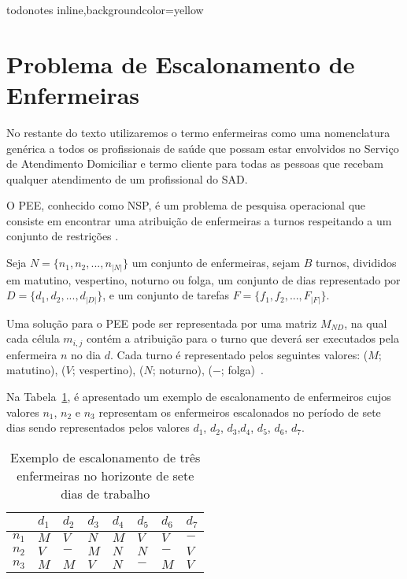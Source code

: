 { }

\presetkeys%
    {todonotes}%
    {inline,backgroundcolor=yellow}{}


\section{Problema de Escalonamento de Enfermeiras}

No restante do texto utilizaremos o termo enfermeiras como uma nomenclatura genérica a todos os profissionais de saúde que possam estar envolvidos no Serviço de Atendimento Domiciliar e termo cliente para todas as pessoas que recebam qualquer atendimento de um profissional do \ac{SAD}.

O \ac{PEE}, conhecido como \ac{NSP}, é um problema de pesquisa operacional que consiste em encontrar uma atribuição de enfermeiras a turnos respeitando a um conjunto de restrições \cite{ioanis:2015}.

Seja $N = \{n_1, n_2, ..., n_{|N|}\}$ um conjunto de enfermeiras, sejam $B$ turnos, divididos em matutino, vespertino, noturno ou folga, um conjunto de dias representado por $D = \{d_1, d_2, ..., d_{|D|}\}$, e um conjunto de tarefas $F = \{ f_1, f_2, ..., F_{|F|} \}$. 

Uma solução para o \ac{PEE} pode ser representada por uma matriz $M_{ND}$, na qual cada célula $m_{i,j}$ contém a atribuição para o turno que deverá ser executados pela enfermeira $n$ no dia $d$.
Cada turno é representado pelos seguintes valores: ($M$; matutino), ($V$; vespertino), ($N$; noturno), ($-$; folga)~\cite{gambini:2012}. 

Na Tabela~\ref{enfermeira_dia}, é apresentado um exemplo de escalonamento de enfermeiros cujos valores $n_1$, $n_2$ e $n_3$ representam os enfermeiros escalonados no período de sete dias sendo representados pelos valores $d_1$, $d_2$, $d_3$,$d_4$, $d_5$, $d_6$, $d_7$.

\begin{table}[ht]
 \centering
\caption{Exemplo de escalonamento de três enfermeiras no horizonte de sete dias de trabalho \label{enfermeira_dia}}
\begin{tabular}{r|l|l|l|l|l|l|l}
  	   & $d_1$ & $d_2$ & $d_3$ & $d_4$ & $d_5$ & $d_6$ & $d_7$ \\ \hline
 $n_1$ & $M$  & $V$  & $N$  & $M$  & $V$  & $V$  & $-$ \\ \hline
 $n_2$ & $V$  & $-$  & $M$  & $N$  & $N$  & $-$  & $V$\\ \hline
 $n_3$ & $M$  & $M$  & $V$  & $N$  & $-$  & $M$  & $V$
\end{tabular}
\end{table}


